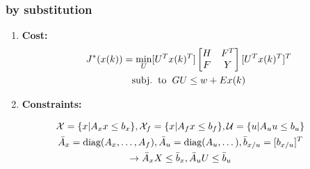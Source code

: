 \subsubsection{by substitution}
\begin{enumerate}
    \item \textbf{Cost:} \begin{gather*}
    J^*(x(k)) = \underset{U}{\mathrm{min}} [U^Tx(k)^T]
    \begin{bmatrix}
    H & F^T\\
    F & Y
    \end{bmatrix} [U^Tx (k)^T ]^T\\ 
    \mathrm{subj.\hspace{2mm} to\hspace{2mm}} GU \leq w + E x(k)
    \end{gather*}
    \item \textbf{Constraints:} 
\end{enumerate}
    \begin{gather*}
        \mathcal{X}= \{x|A_xx\leq b_x\}, \mathcal{X}_f = \{x|A_fx\leq b_f\}, \mathcal{U} = \{u|A_uu\leq b_u\}\\
        \Bar{A}_x =\textrm{diag}(A_x,\dotsc,A_f), \Bar{A}_u = \textrm{diag}(A_u,\dotsc), \Bar{b}_{x/u} = [b_{x/u}]^T\\ \rightarrow \Bar{A}_xX\leq \Bar{b}_x, \Bar{A}_uU\leq\Bar{b}_u
    \end{gather*}
